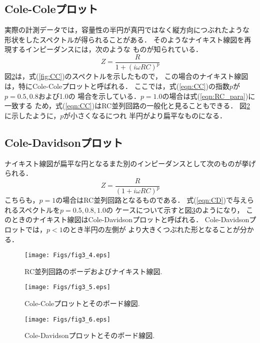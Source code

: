 \subsection{Cole-Coleプロット}
実際の計測データでは，容量性の半円が真円ではなく縦方向につぶれたような
形状をしたスペクトルが得られることがある．
そのようなナイキスト線図を再現するインピーダンスには，次のような
ものが知られている．
\begin{equation}
	Z =\frac{R}{1+\left(i\omega RC\right)^p}
	\label{eqn:CC}
\end{equation}
図\ref{fig:fig3_5}は，式(\ref{fig:CC})のスペクトルを示したもので，
この場合のナイキスト線図は，特にCole-Coleプロットと呼ばれる．
ここでは，式(\ref{eqn:CC})の指数$p$が$p=0.5,0.8$および1.0の
場合を示している．$p=1.0$の場合は式(\ref{eqn:RC_para})に一致する
ため，式(\ref{eqn:CC})はRC並列回路の一般化と見ることもできる．
図\ref{fig:fig3_5}に示したように，$p$が小さくなるにつれ
半円がより扁平なものになる．
\subsection{Cole-Davidsonプロット}
ナイキスト線図が扁平な円となるまた別のインピーダンスとして次のものが挙げられる．
\begin{equation}
	Z =\frac{R}{\left(1+i\omega RC\right)^p}
	\label{eqn:CD}
\end{equation}
こちらも，$p=1$の場合はRC並列回路となるものである．
式(\ref{eqn:CD})で与えられるスペクトルを$p=0.5,0.8,1.0$の
ケースについて示すと図\ref{fig:fig3_6}のようになり，
このときのナイキスト線図はCole-Davidsonプロットと呼ばれる．
Cole-Davidsonプロットでは，$p<1$のとき半円の左側が
より大きくつぶれた形となることが分かる．
\begin{figure}[h]
	\begin{center}
	\texttt{[image: Figs/fig3\_4.eps]} 
	\end{center}
	\caption{
		RC並列回路のボーデおよびナイキスト線図.
	} 
	\label{fig:fig3_4}
\end{figure}
\begin{figure}[h]
	\begin{center}
	\texttt{[image: Figs/fig3\_5.eps]} 
	\end{center}
	\caption{
		Cole-Coleプロットとそのボード線図.
	} 
	\label{fig:fig3_5}
\end{figure}
\begin{figure}[h]
	\begin{center}
	\texttt{[image: Figs/fig3\_6.eps]} 
	\end{center}
	\caption{
		Cole-Davidsonプロットとそのボード線図.
	} 
	\label{fig:fig3_6}
\end{figure}
